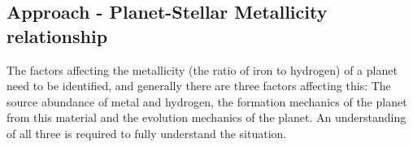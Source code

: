 \documentclass[a4paper,twocolumn,12pt]{article}
\begin{document}



\subsection{Approach - Planet-Stellar Metallicity relationship}
\label{subsection: Approach}

The factors affecting the metallicity (the ratio of iron to hydrogen) of a planet need to be identified, and generally there are three factors affecting this: The source abundance of metal and hydrogen, the formation mechanics of the planet from this material and the evolution mechanics of the planet. An understanding of all three is required to fully understand the situation.
\end{document}
